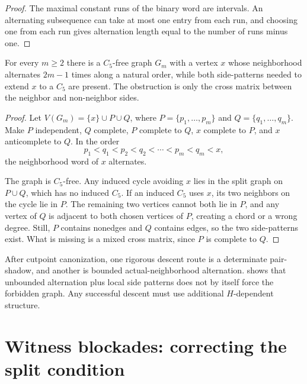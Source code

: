 \begin{proof}
The maximal constant runs of the binary word are intervals. An alternating subsequence can take at most one entry from each run, and choosing one from each run gives alternation length equal to the number of runs minus one.
\end{proof}

\begin{proposition}\label{prop:C5-semantic}
For every $m\ge 2$ there is a $C_5$-free graph $G_m$ with a vertex $x$ whose neighborhood alternates $2m-1$ times along a natural order, while both side-patterns needed to extend $x$ to a $C_5$ are present. The obstruction is only the cross matrix between the neighbor and non-neighbor sides.
\end{proposition}

\begin{proof}
Let $V(G_m)=\{x\}\cup P\cup Q$, where $P=\{p_1,\dots,p_m\}$ and $Q=\{q_1,\dots,q_m\}$. Make $P$ independent, $Q$ complete, $P$ complete to $Q$, $x$ complete to $P$, and $x$ anticomplete to $Q$. In the order
\[
  p_1<q_1<p_2<q_2<\cdots<p_m<q_m<x,
\]
the neighborhood word of $x$ alternates.

The graph is $C_5$-free. Any induced cycle avoiding $x$ lies in the split graph on $P\cup Q$, which has no induced $C_5$. If an induced $C_5$ uses $x$, its two neighbors on the cycle lie in $P$. The remaining two vertices cannot both lie in $P$, and any vertex of $Q$ is adjacent to both chosen vertices of $P$, creating a chord or a wrong degree. Still, $P$ contains nonedges and $Q$ contains edges, so the two side-patterns exist. What is missing is a mixed cross matrix, since $P$ is complete to $Q$.
\end{proof}

\begin{remark}
After cutpoint canonization, one rigorous descent route is a determinate pair-shadow, and another is bounded actual-neighborhood alternation.  shows that unbounded alternation plus local side patterns does not by itself force the forbidden graph. Any successful descent must use additional $H$-dependent structure.
\end{remark}

\section{Witness blockades: correcting the split condition}

